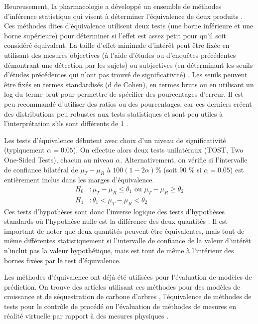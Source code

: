             Heureusement, la pharmacologie a développé un ensemble de méthodes d'inférence statistique qui visent à déterminer l'équivalence de deux produits \parencite{schuirmann_comparison_1987,lakens_equivalence_2018}. Ces méthodes dites d'équivalence utilisent deux tests (une borne inférieure et une borne supérieure) pour déterminer si l'effet est assez petit pour qu'il soit considéré équivalent. La taille d'effet minimale d'intérêt peut être fixée en utilisant des mesures objectives (à l'aide d'études ou d'enquêtes précédentes démontrant une détection par les sujets) ou subjectives (en déterminant les seuils d'études précédentes qui n'ont pas trouvé de significativité) \parencite{lakens_equivalence_2018}. Les seuils peuvent être fixés en termes standardisés (d de Cohen), en termes bruts ou en utilisant un log du terme brut pour permettre de spécifier des pourcentages d'erreur. Il est peu recommandé d'utiliser des ratios ou des pourcentages, car ces derniers créent des distributions peu robustes aux tests statistiques et sont peu utiles à l'interprétation s'ils sont différents de 1 \parencite{jasienski_fallacy_1999,curran-everett_explorations_2013}.\par
            Les tests d'équivalence débutent avec choix d'un niveau de significativité (typiquement $\alpha = 0.05$). On effectue alors deux tests unilatéraux (TOST, Two One-Sided Tests), chacun au niveau $\alpha$. Alternativement, on vérifie si l'intervalle de confiance bilatéral de $\mu_T - \mu_R $ à $100(1-2\alpha)\%$ (soit 90 \% si $\alpha=0.05$) est entièrement inclus dans les marges d'équivalence.
            \begin{align}
                H_0 &:\mu_T - \mu_R \leq \theta_1 \text{ ou } \mu_T - \mu_R \geq \theta_2\\
                H_1 &:\theta_1 <\mu_T - \mu_R <\theta_2
            \end{align}
            Ces tests d'hypothèses sont donc l'inverse logique des tests d'hypothèses standards où l'hypothèse nulle est la différence des deux quantités \parencite{walker_understanding_2011}. Il est important de noter que deux quantités peuvent être équivalentes, mais tout de même différentes statistiquement si l'intervalle de confiance de la valeur d'intérêt n'inclut pas la valeur hypothétique, mais est tout de même à l'intérieur des bornes fixées par le test d'équivalence.\par
            Les méthodes d'équivalence ont déjà été utilisées pour l'évaluation de modèles de prédiction.  On trouve des articles utilisant ces méthodes pour des modèles de croissance et de séquestration de carbone d'arbres \parencite{robinson_model_2004,herbert_validation_2023}, l’équivalence de méthodes de tests pour le contrôle de procédé \parencite{manola_probability_2019} ou l'évaluation de méthodes de mesures en réalité virtuelle par rapport à des mesures physiques \parencite{anik_accuracy_2020} .\par
